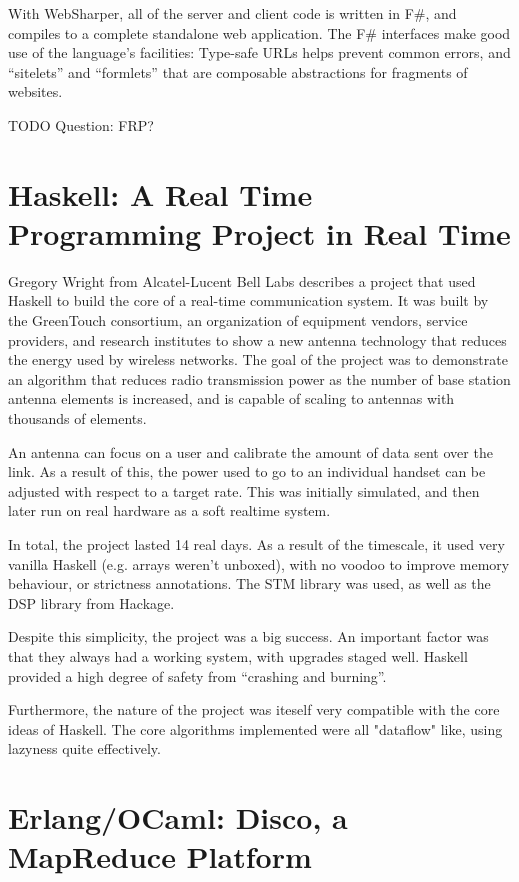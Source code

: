 \documentclass{jfp1}
\begin{document}
With WebSharper, all of the server and client code is written in F\#,
and compiles to a complete standalone web application. The F\#
interfaces make good use of the language's facilities: Type-safe URLs
helps prevent common errors, and ``sitelets'' and ``formlets'' that are
composable abstractions for fragments of websites.

TODO Question: FRP?

\section{Haskell: A Real Time Programming Project in Real Time}

Gregory Wright from Alcatel-Lucent Bell Labs describes a project that
used Haskell to build the core of a real-time communication system.  It
was built by the GreenTouch consortium, an organization of equipment
vendors, service providers, and research institutes to show a new
antenna technology that reduces the energy used by wireless networks.
The goal of the project was to demonstrate an algorithm that reduces
radio transmission power as the number of base station antenna elements
is increased, and is capable of scaling to antennas with thousands of
elements.

An antenna can focus on a user and calibrate the amount of data sent
over the link. As a result of this, the power used to go to an
individual handset can be adjusted with respect to a target rate.  This
was initially simulated, and then later run on real hardware as a soft
realtime system.

In total, the project lasted 14 real days. As a result of the timescale,
it used very vanilla Haskell (e.g. arrays weren't unboxed), with no
voodoo to improve memory behaviour, or strictness annotations. The STM
library was used, as well as the DSP library from Hackage.

Despite this simplicity, the project was a big success. An important
factor was that they always had a working system, with upgrades staged
well. Haskell provided a high degree of safety from ``crashing and
burning''.

Furthermore, the nature of the project was iteself very compatible with
the core ideas of Haskell. The core algorithms implemented were all
"dataflow" like, using lazyness quite effectively.

\section{Erlang/OCaml: Disco, a MapReduce Platform}
\end{document}
